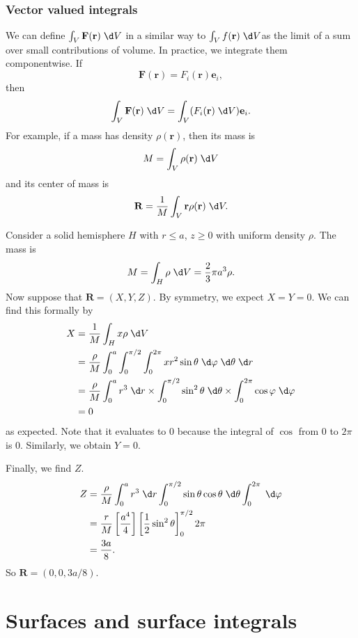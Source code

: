 \documentclass[a4paper]{article}
\begin{document}
\subsubsection{Vector valued integrals}
We can define $\int_V \mathbf{F}(\mathbf{r})\;\d V$ in a similar way to $\int_V f(\mathbf{r})\;\d V$as the limit of a sum over small contributions of volume. In practice, we integrate them componentwise. If
\[
  \mathbf{F}(\mathbf{r}) = F_{i}(\mathbf{r})\mathbf{e}_i,
\]
then
\[
  \int_V \mathbf{F}(\mathbf{r})\;\d V = \int_V (F_i(\mathbf{r})\;\d V)\mathbf{e}_i.
\]
For example, if a mass has density $\rho (\mathbf{r})$, then its mass is
\[
  M = \int_V \rho(\mathbf{r})\;\d V
\]
and its center of mass is
\[
  \mathbf{R} = \frac{1}{M}\int_V \mathbf{r}\rho (\mathbf{r})\;\d V.
\]
\begin{eg}
  Consider a solid hemisphere $H$ with $r \leq a$, $z \geq 0$ with uniform density $\rho$. The mass is
  \[
    M = \int_H \rho \;\d V = \frac{2}{3}\pi a^3\rho.
  \]
  Now suppose that $\mathbf{R} = (X, Y, Z)$. By symmetry, we expect $X = Y = 0$. We can find this formally by
  \begin{align*}
    X &= \frac{1}{M}\int_H x\rho \;\d V\\
    &= \frac{\rho}{M}\int_0^a \int_0^{\pi/2}\int_0^{2\pi}xr^2 \sin \theta\;\d \varphi\;\d \theta\;\d r\\
    &= \frac{\rho}{M}\int_0^{a}r^3\;\d r\times \int_0^{\pi/2}\sin^2\theta\;\d \theta\times \int_0^{2\pi}\cos\varphi\;\d \varphi\\
    &= 0
  \end{align*}
  as expected. Note that it evaluates to 0 because the integral of $\cos$ from $0$ to $2\pi$ is 0. Similarly, we obtain $Y = 0$.

  Finally, we find $Z$.
  \begin{align*}
    Z &= \frac{\rho}{M}\int_0^a r^3\;\d r \int_0^{\pi/2}\sin\theta\cos\theta\;\d \theta \int_0^{2\pi}\;\d \varphi\\
    &= \frac{r}{M}\left[\frac{a^4}{4}\right]\left[\frac{1}{2}\sin^2\theta\right]_0^{\pi/2}2\pi\\
    &= \frac{3a}{8}. 
  \end{align*}
  So $\mathbf{R} = (0, 0, 3a/8)$.
\end{eg}

\section{Surfaces and surface integrals}
\end{document}
